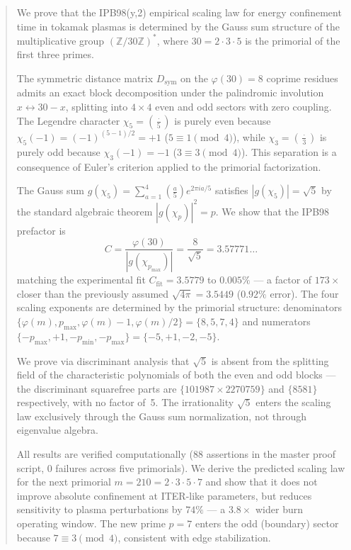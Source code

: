 \documentclass[11pt,letterpaper]{article}
\theoremstyle{definition}
\begin{document}
\begin{abstract}
\setlength{\parskip}{0.8em plus 0.2em minus 0.1em}
We prove that the IPB98(y,2) empirical scaling law for energy confinement time in tokamak plasmas is determined by the Gauss sum structure of the multiplicative group $(\mathbb{Z}/30\mathbb{Z})^*$, where $30 = 2 \cdot 3 \cdot 5$ is the primorial of the first three primes.

The symmetric distance matrix $D_{\text{sym}}$ on the $\varphi(30) = 8$ coprime residues admits an exact block decomposition under the palindromic involution $x \leftrightarrow 30 - x$, splitting into $4 \times 4$ even and odd sectors with zero coupling. The Legendre character $\chi_5 = \left(\frac{\cdot}{5}\right)$ is purely even because $\chi_5(-1) = (-1)^{(5-1)/2} = +1$ ($5 \equiv 1 \pmod{4}$), while $\chi_3 = \left(\frac{\cdot}{3}\right)$ is purely odd because $\chi_3(-1) = -1$ ($3 \equiv 3 \pmod{4}$). This separation is a consequence of Euler's criterion applied to the primorial factorization.

The Gauss sum $g(\chi_5) = \sum_{a=1}^{4} \left(\frac{a}{5}\right) e^{2\pi i a/5}$ satisfies $|g(\chi_5)| = \sqrt{5}$ by the standard algebraic theorem $|g(\chi_p)|^2 = p$. We show that the IPB98 prefactor is
\[
C = \frac{\varphi(30)}{|g(\chi_{p_{\text{max}}})|}
  = \frac{8}{\sqrt{5}}
  = 3.57771\ldots
\]
matching the experimental fit $C_{\text{fit}} = 3.5779$ to $0.005\%$ --- a factor of $173\times$ closer than the previously assumed $\sqrt{4\pi} = 3.5449$ ($0.92\%$ error). The four scaling exponents are determined by the primorial structure: denominators $\{\varphi(m), p_{\text{max}}, \varphi(m)-1, \varphi(m)/2\} = \{8, 5, 7, 4\}$ and numerators $\{-p_{\text{max}}, +1, -p_{\text{min}}, -p_{\text{max}}\} = \{-5, +1, -2, -5\}$.

We prove via discriminant analysis that $\sqrt{5}$ is absent from the splitting field of the characteristic polynomials of both the even and odd blocks --- the discriminant squarefree parts are $\{101987 \times 2270759\}$ and $\{8581\}$ respectively, with no factor of~5. The irrationality $\sqrt{5}$ enters the scaling law exclusively through the Gauss sum normalization, not through eigenvalue algebra.

All results are verified computationally (88 assertions in the master proof script, 0 failures across five primorials). We derive the predicted scaling law for the next primorial $m = 210 = 2 \cdot 3 \cdot 5 \cdot 7$ and show that it does not improve absolute confinement at ITER-like parameters, but reduces sensitivity to plasma perturbations by $74\%$ --- a $3.8\times$ wider burn operating window. The new prime $p = 7$ enters the odd (boundary) sector because $7 \equiv 3 \pmod{4}$, consistent with edge stabilization.


\end{abstract}
\end{document}
